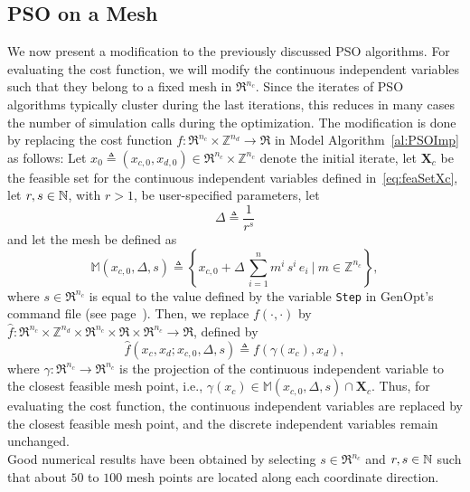\subsection{PSO on a Mesh}
\label{sec:PSOMes}
We now present a modification to the previously discussed PSO
algorithms.
For evaluating the cost function, we will modify the continuous
independent variables such that they belong to a fixed mesh in $\Re^{n_c}$.
Since the iterates of PSO algorithms typically cluster during the last
iterations, this reduces in many cases the number of simulation calls
during the optimization. The modification is done by replacing the cost
function $f \colon \Re^{n_c} \times \mathbb Z^{n_d} \to \Re$ in 
Model Algorithm~\ref{al:PSOImp} as follows:
Let $x_0 \triangleq (x_{c,0}, x_{d,0} ) \in \Re^{n_c} \times \mathbb Z^{n_c}$
denote the initial iterate,
let $\mathbf X_c$ be the feasible set for the continuous independent variables
defined in~\eqref{eq:feaSetXc},
let $r, s \in {\mathbb N}$, with $r>1$, be user-specified parameters, let
\begin{equation}
  \Delta \triangleq \frac{1}{r^s}
\label{eq:PSOMeshDiv}
\end{equation}
and let the mesh be defined as
\begin{equation}
  \mathbb M(x_{c,0}, \Delta, s) \triangleq \left\{ x_{c,0} + \Delta \,
  \sum_{i=1}^n m^i \,
  s^i \, e_i \ | \ m \in \mathbb Z^{n_c} \right\},
\label{eq:PSODefMesh}
\end{equation}
where $s \in \Re^{n_c}$ is equal to the value defined by the variable
\texttt{Step} in GenOpt's command file (see page~\pageref{par:comFil}).
Then, we replace $f(\cdot, \cdot)$ by 
$\widehat f \colon \Re^{n_c} \times \mathbb Z^{n_d} \times \Re^{n_c} \times \Re  \times \Re^{n_c} \to \Re$, defined by
\begin{equation}
  \widehat f( x_c, x_d; x_{c,0}, \Delta, s) \triangleq 
  f( \gamma( x_c ), x_d),
\end{equation}
where $\gamma \colon \Re^{n_c} \to \Re^{n_c}$ is the projection of the
continuous independent variable to the closest feasible mesh point,
i.e., $\gamma(x_c) \in \mathbb M(x_{c,0}, \Delta, s) \cap \mathbf X_c$.
Thus, for evaluating the cost function, 
the continuous independent variables are replaced by the closest
feasible mesh point, and the discrete independent variables
remain unchanged.\\

Good numerical results have been obtained by selecting $s \in \Re^{n_c}$ and
$r, s \in {\mathbb N}$ such that 
about $50$ to $100$ mesh points are located
along each coordinate direction.


